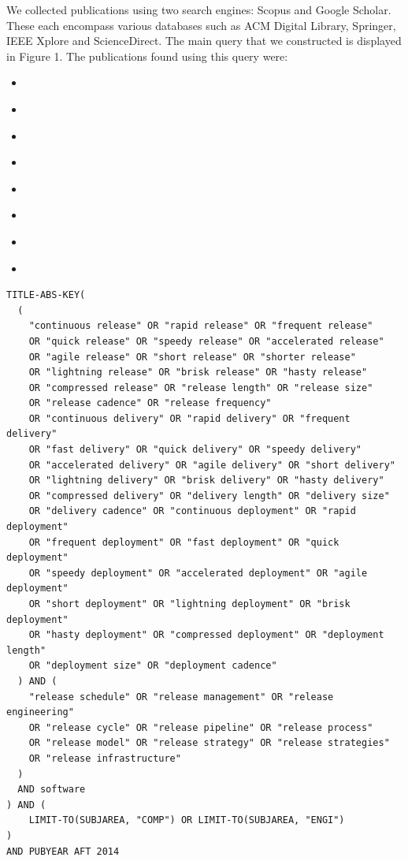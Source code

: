 \documentclass[]{book}
\providecommand{\tightlist}{%
  \setlength{\itemsep}{0pt}\setlength{\parskip}{0pt}}
\begin{document}
We collected publications using two search engines: Scopus and Google
Scholar. These each encompass various databases such as ACM Digital
Library, Springer, IEEE Xplore and ScienceDirect. The main query that we
constructed is displayed in Figure 1. The publications found using this
query were:

\begin{itemize}
\tightlist
\item
  \citet{kaur2019a}
\item
  \citet{kerzazi2013a}
\item
  \citet{castelluccio2017a}
\item
  \citet{karvonen2017a}
\item
  \citet{claes2017a}
\item
  \citet{fujibayashi2017a}
\item
  \citet{souza2015a}
\item
  \citet{laukkanen2018a}
\end{itemize}

\begin{verbatim}
TITLE-ABS-KEY(
  (
    "continuous release" OR "rapid release" OR "frequent release"
    OR "quick release" OR "speedy release" OR "accelerated release"
    OR "agile release" OR "short release" OR "shorter release"
    OR "lightning release" OR "brisk release" OR "hasty release"
    OR "compressed release" OR "release length" OR "release size"
    OR "release cadence" OR "release frequency"
    OR "continuous delivery" OR "rapid delivery" OR "frequent delivery"
    OR "fast delivery" OR "quick delivery" OR "speedy delivery"
    OR "accelerated delivery" OR "agile delivery" OR "short delivery"
    OR "lightning delivery" OR "brisk delivery" OR "hasty delivery"
    OR "compressed delivery" OR "delivery length" OR "delivery size"
    OR "delivery cadence" OR "continuous deployment" OR "rapid deployment"
    OR "frequent deployment" OR "fast deployment" OR "quick deployment"
    OR "speedy deployment" OR "accelerated deployment" OR "agile deployment"
    OR "short deployment" OR "lightning deployment" OR "brisk deployment"
    OR "hasty deployment" OR "compressed deployment" OR "deployment length"
    OR "deployment size" OR "deployment cadence"
  ) AND (
    "release schedule" OR "release management" OR "release engineering"
    OR "release cycle" OR "release pipeline" OR "release process"
    OR "release model" OR "release strategy" OR "release strategies"
    OR "release infrastructure"
  )
  AND software
) AND (
    LIMIT-TO(SUBJAREA, "COMP") OR LIMIT-TO(SUBJAREA, "ENGI")
)
AND PUBYEAR AFT 2014
\end{verbatim}
\end{document}
